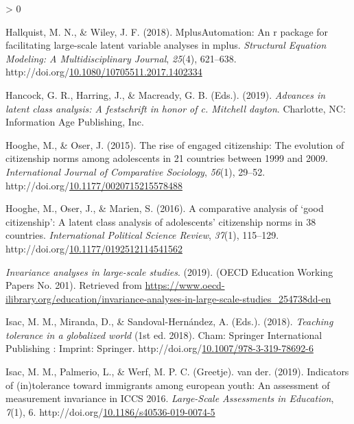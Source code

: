 \documentclass[12pt,a4paper,oneside]{reedthesis}
\newlength{\cslhangindent}
\newenvironment{CSLReferences}[2] %
 {%
  \setlength{\parindent}{0pt}
  \ifodd #1 \everypar{\setlength{\hangindent}{\cslhangindent}}\ignorespaces\fi
  \ifnum #2 > 0
  \setlength{\parskip}{#2\baselineskip}
  \fi
 }%
 {}
\begin{document}
\begin{CSLReferences}{1}{0}
\leavevmode\hypertarget{ref-hallquist_mplusautomation_2018}{}%
Hallquist, M. N., \& Wiley, J. F. (2018). {MplusAutomation}: An r package for facilitating large-scale latent variable analyses in mplus. \emph{Structural Equation Modeling: A Multidisciplinary Journal}, \emph{25}(4), 621--638. http://doi.org/\href{https://doi.org/10.1080/10705511.2017.1402334}{10.1080/10705511.2017.1402334}

\leavevmode\hypertarget{ref-hancock_advances_2019}{}%
Hancock, G. R., Harring, J., \& Macready, G. B. (Eds.). (2019). \emph{Advances in latent class analysis: A festschrift in honor of c. Mitchell dayton}. Charlotte, {NC}: Information Age Publishing, Inc.

\leavevmode\hypertarget{ref-hooghe_rise_2015}{}%
Hooghe, M., \& Oser, J. (2015). The rise of engaged citizenship: The evolution of citizenship norms among adolescents in 21 countries between 1999 and 2009. \emph{International Journal of Comparative Sociology}, \emph{56}(1), 29--52. http://doi.org/\href{https://doi.org/10.1177/0020715215578488}{10.1177/0020715215578488}

\leavevmode\hypertarget{ref-hooghe_comparative_2016}{}%
Hooghe, M., Oser, J., \& Marien, S. (2016). A comparative analysis of {`good citizenship'}: A latent class analysis of adolescents' citizenship norms in 38 countries. \emph{International Political Science Review}, \emph{37}(1), 115--129. http://doi.org/\href{https://doi.org/10.1177/0192512114541562}{10.1177/0192512114541562}

\leavevmode\hypertarget{ref-noauthor_invariance_2019}{}%
\emph{Invariance analyses in large-scale studies}. (2019). (OECD Education Working Papers No. 201). Retrieved from \url{https://www.oecd-ilibrary.org/education/invariance-analyses-in-large-scale-studies_254738dd-en}

\leavevmode\hypertarget{ref-isac_teaching_2018}{}%
Isac, M. M., Miranda, D., \& Sandoval-Hernández, A. (Eds.). (2018). \emph{Teaching tolerance in a globalized world} (1st ed. 2018). Cham: Springer International Publishing : Imprint: Springer. http://doi.org/\href{https://doi.org/10.1007/978-3-319-78692-6}{10.1007/978-3-319-78692-6}

\leavevmode\hypertarget{ref-isac_indicators_2019}{}%
Isac, M. M., Palmerio, L., \& Werf, M. P. C. (Greetje). van der. (2019). Indicators of (in)tolerance toward immigrants among european youth: An assessment of measurement invariance in {ICCS} 2016. \emph{Large-Scale Assessments in Education}, \emph{7}(1), 6. http://doi.org/\href{https://doi.org/10.1186/s40536-019-0074-5}{10.1186/s40536-019-0074-5}


\end{CSLReferences}
\end{document}
